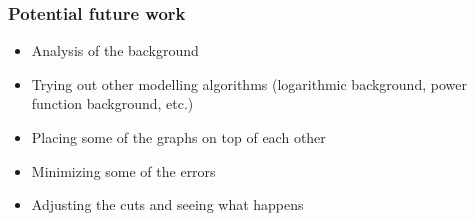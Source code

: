 \documentclass{beamer}
\begin{document}
\frame %
{
\frametitle{Potential future work}
\begin{itemize}
\item Analysis of the background
\item Trying out other modelling algorithms (logarithmic background, power function background, etc.)
\item Placing some of the graphs on top of each other
\item Minimizing some of the errors
\item Adjusting the cuts and seeing what happens
\end{itemize}
}
\end{document}
